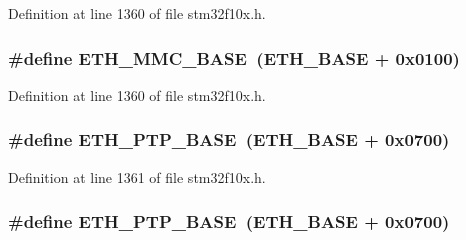 Definition at line 1360 of file stm32f10x.\+h.

\subsubsection[{\texorpdfstring{E\+T\+H\+\_\+\+M\+M\+C\+\_\+\+B\+A\+SE}{ETH_MMC_BASE}}]{\setlength{\rightskip}{0pt plus 5cm}\#define E\+T\+H\+\_\+\+M\+M\+C\+\_\+\+B\+A\+SE~({\bf E\+T\+H\+\_\+\+B\+A\+SE} + 0x0100)}\hypertarget{group___peripheral__memory__map_ga4946f2b3b03f7998343ac1778fbcf725}{}\label{group___peripheral__memory__map_ga4946f2b3b03f7998343ac1778fbcf725}


Definition at line 1360 of file stm32f10x.\+h.

\subsubsection[{\texorpdfstring{E\+T\+H\+\_\+\+P\+T\+P\+\_\+\+B\+A\+SE}{ETH_PTP_BASE}}]{\setlength{\rightskip}{0pt plus 5cm}\#define E\+T\+H\+\_\+\+P\+T\+P\+\_\+\+B\+A\+SE~({\bf E\+T\+H\+\_\+\+B\+A\+SE} + 0x0700)}\hypertarget{group___peripheral__memory__map_gaa0f60b922aeb7275c785cbaa8f94ecf0}{}\label{group___peripheral__memory__map_gaa0f60b922aeb7275c785cbaa8f94ecf0}


Definition at line 1361 of file stm32f10x.\+h.

\subsubsection[{\texorpdfstring{E\+T\+H\+\_\+\+P\+T\+P\+\_\+\+B\+A\+SE}{ETH_PTP_BASE}}]{\setlength{\rightskip}{0pt plus 5cm}\#define E\+T\+H\+\_\+\+P\+T\+P\+\_\+\+B\+A\+SE~({\bf E\+T\+H\+\_\+\+B\+A\+SE} + 0x0700)}\hypertarget{group___peripheral__memory__map_gaa0f60b922aeb7275c785cbaa8f94ecf0}{}\label{group___peripheral__memory__map_gaa0f60b922aeb7275c785cbaa8f94ecf0}



